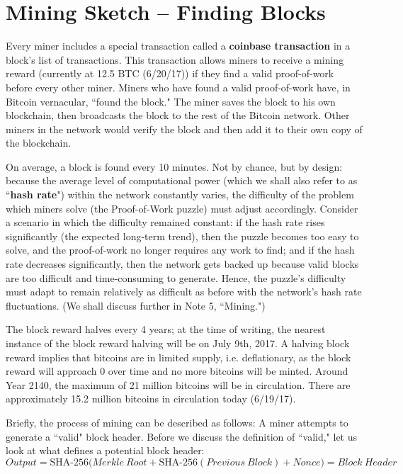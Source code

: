 \documentclass[full.tex]{subfiles}
\begin{document}
    \section*{Mining Sketch -- Finding Blocks}
    
    Every miner includes a special transaction called a \textbf{coinbase transaction} in a block's list of transactions. This transaction allows miners to receive a mining reward \big(currently at 12.5 BTC (6/20/17)\big) if they find a valid proof-of-work before every other miner. Miners who have found a valid proof-of-work have, in Bitcoin vernacular, ``found the block." The miner saves the block to his own blockchain, then broadcasts the block to the rest of the Bitcoin network. Other miners in the network would verify the block and then add it to their own copy of the blockchain.
    
    On average, a block is found every 10 minutes. Not by chance, but by design: because the average level of computational power (which we shall also refer to as ``\textbf{hash rate}") within the network constantly varies, the difficulty of the problem which miners solve (the Proof-of-Work puzzle) must adjust accordingly. Consider a scenario in which the difficulty remained constant: if the hash rate rises significantly (the expected long-term trend), then the puzzle becomes too easy to solve, and the proof-of-work no longer requires any work to find; and if the hash rate decreases significantly, then the network gets backed up because valid blocks are too difficult and time-consuming to generate. Hence, the puzzle's difficulty must adapt to remain relatively as difficult as before with the network's hash rate fluctuations. (We shall discuss further in Note 5, ``Mining.") 
    
    The block reward halves every 4 years; at the time of writing, the nearest instance of the block reward halving will be on July 9th, 2017. A halving block reward implies that bitcoins are in limited supply, i.e. deflationary, as the block reward will approach 0 over time and no more bitcoins will be minted. Around Year 2140, the maximum of 21 million bitcoins will be in circulation. There are approximately 15.2 million bitcoins in circulation today (6/19/17).
    
    Briefly, the process of mining can be described as follows: A miner attempts to generate a ``valid" block header. Before we discuss the definition of ``valid," let us look at what defines a potential block header:
    $$\mathit{Output} = \text{SHA-256}\big(\mathit{Merkle~Root} + \text{SHA-256}(\mathit{Previous~Block}) + \mathit{Nonce}\big) = \mathit{Block~Header}$$
    
\end{document}
